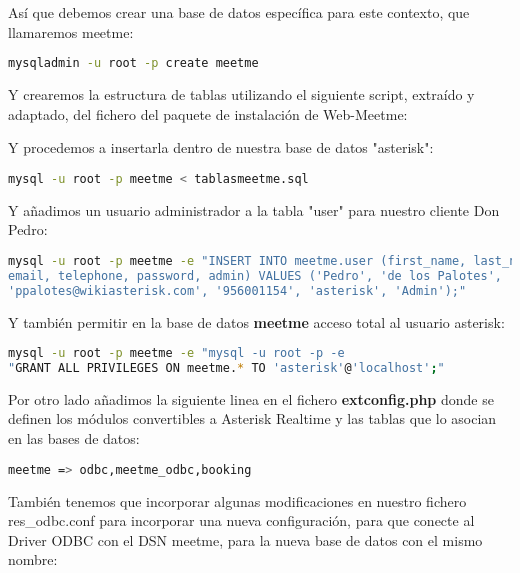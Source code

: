 Así que debemos crear una base de datos específica para este contexto, que llamaremos meetme:

\begin{lstlisting}[language=sh]
mysqladmin -u root -p create meetme
\end{lstlisting}

Y crearemos la estructura de tablas utilizando el siguiente script, extraído y adaptado, del fichero del paquete de instalación de Web-Meetme:



Y procedemos a insertarla dentro de nuestra base de datos "asterisk":

\begin{lstlisting}[language=sh]
mysql -u root -p meetme < tablasmeetme.sql
\end{lstlisting}

Y añadimos un usuario administrador a la tabla "user" para nuestro cliente Don Pedro:

\begin{lstlisting}[language=sh]
mysql -u root -p meetme -e "INSERT INTO meetme.user (first_name, last_name, 
email, telephone, password, admin) VALUES ('Pedro', 'de los Palotes', 
'ppalotes@wikiasterisk.com', '956001154', 'asterisk', 'Admin');"
\end{lstlisting}

Y también permitir en la base de datos \textbf{meetme} acceso total al usuario asterisk:

\begin{lstlisting}[language=sh]
mysql -u root -p meetme -e "mysql -u root -p -e 
"GRANT ALL PRIVILEGES ON meetme.* TO 'asterisk'@'localhost';"
\end{lstlisting}

Por otro lado añadimos la siguiente linea en el fichero \textbf{extconfig.php} donde se definen los módulos convertibles a Asterisk Realtime y las tablas que lo asocian en las bases de datos:

\begin{lstlisting}[language=bash,title={/etc/asterisk/extconfig.conf}]
meetme => odbc,meetme_odbc,booking
\end{lstlisting}

También tenemos que incorporar algunas modificaciones en nuestro fichero res\_odbc.conf para incorporar una nueva configuración, para que conecte al Driver ODBC con el DSN meetme, para la nueva base de datos con el mismo nombre:

